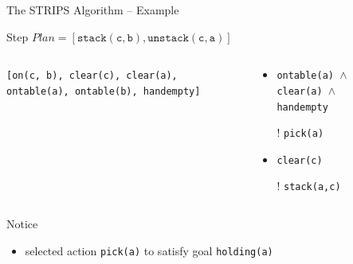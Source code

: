 \documentclass[presentation]{beamer}\mode<presentation>{\usetheme{AMSBolognaFC}}
\begin{document}
\begin{frame}[c]{The STRIPS Algorithm -- Example}
\small

\begin{exampleblock}{Step \nextStripsExampleStep{} \hfill $Plan = [\mathtt{stack(c,b),unstack(c,a)}]$}
    \begin{columns}[t]
        \begin{column}{.30\linewidth}\centering
            \texttt{[on(c, b), clear(c), clear(a), ontable(a), ontable(b), handempty]}
        \end{column}
        \begin{column}{.50\linewidth}\centering
            \begin{itemize}
                \item \texttt{ontable(a) $\wedge$ clear(a) $\wedge$ handempty}
                \item[!] \texttt{pick(a)}
                \item \texttt{clear(c)}
                \item[!] \texttt{stack(a,c)}
            \end{itemize}
        \end{column}
        \begin{column}{.10\linewidth}\centering
            
        \end{column}
    \end{columns}
\end{exampleblock}

\vfill

\footnotesize
Notice
\begin{itemize}\tiny
    \item selected action \texttt{pick(a)} to satisfy goal \texttt{holding(a)}
\end{itemize}

\end{frame}
\end{document}
